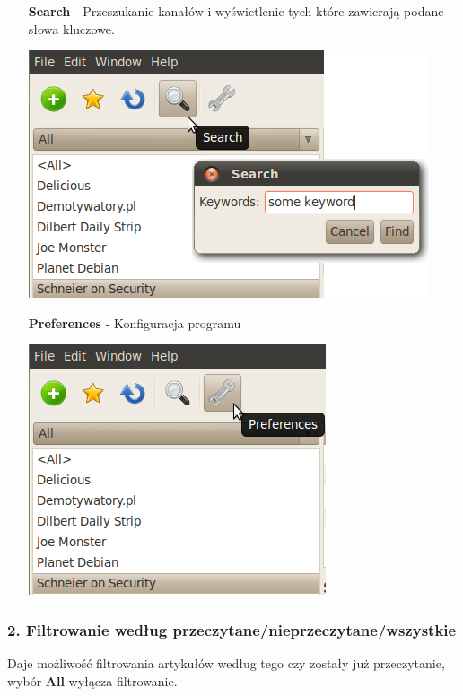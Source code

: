\documentclass[a4paper,11pt]{report}
\begin{document}
\begin{itemize}
	\newpage
	\item[\textbf{Search}] - Przeszukanie kanałów i wyświetlenie tych które 
		zawierają podane słowa kluczowe.
	\begin{center}
		\includegraphics[scale=0.5]{./img/menu_search.png}
	\end{center}

	\newpage
	\item[\textbf{Preferences}] - Konfiguracja programu
	\begin{center}
		\includegraphics[scale=0.5]{./img/menu_pref.png}
	\end{center}
\end{itemize}

\newpage
\subsubsection*{2. Filtrowanie według przeczytane/nieprzeczytane/wszystkie}
Daje możliwość filtrowania artykułów według tego czy zostały już przeczytanie,
wybór \textbf{All} wyłącza filtrowanie.
\end{document}
